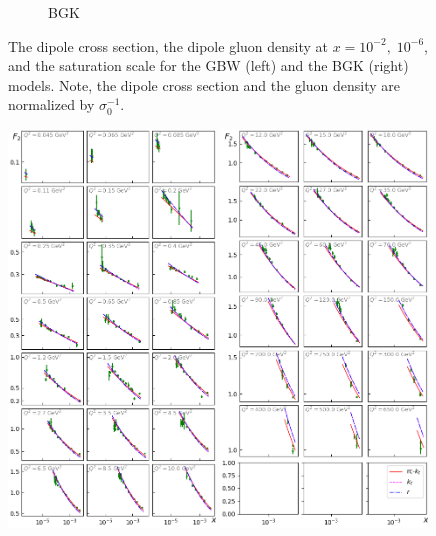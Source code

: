\documentclass[11pt]{article}
\begin{document}
\begin{figure}[p]
\begin{multicols}{2}
\begin{subfigure}{0.5\textwidth}
    \caption{BGK}
    \label{fig:BGK}
\end{subfigure}
  \end{multicols}
  \caption{The dipole cross section, the dipole gluon density at $x=10^{-2},\;
  10^{-6}$, and the saturation scale for the GBW (left) and the BGK (right)
  models. Note, the dipole cross section and the gluon density are normalized by
  $\sigma_0^{-1}$.} 
\label{fig:GBW-BGK}
\end{figure}

\begin{figure}[p]
\includegraphics[width=0.49\textwidth]{./plots/Figure_1.png}
\includegraphics[width=0.49\textwidth]{./plots/Figure_2.png}

\end{figure}
\end{document}

